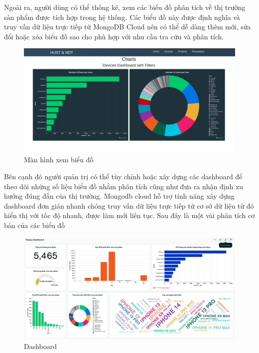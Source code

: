 \documentclass[../DoAn.tex]{subfiles}
\begin{document}
Ngoài ra, người dùng có thể thống kê, xem các biểu đồ phân tích về thị trường sản phẩm được tích hợp trong hệ thống. Các biểu đồ này được định nghĩa và truy vấn dữ liệu trực tiếp từ MongoDB Cloud nên có thể dễ dàng thêm mới, sửa đổi hoặc xóa biểu đồ sao cho phù hợp với nhu cầu tra cứu và phân tích.

\begin{figure}[H]
    \centering
    \includegraphics[scale=0.25]{Hinhve/chart_UI.png}
    \caption{Màn hình xem biểu đồ}
    \label{fig:my_label2}
\end{figure}

Bên cạnh đó người quản trị có thể tùy chỉnh hoặc xây dựng các dashboard để theo dõi những số liệu biểu đồ nhằm phân tích cũng như đưa ra nhận định xu hướng đúng đắn của thị trường. Mongodb cloud hỗ trợ tính năng xây dựng dashboard đơn giản nhanh chóng truy vấn dữ liệu trực tiếp từ cơ sở dữ liệu từ đó hiển thị với tốc độ nhanh, được làm mới liên tục.
Sau đây là một vài phân tích cơ bản của các biểu đồ 


\begin{figure}[H]
    \centering
    \includegraphics[scale=0.22]{Hinhve/dashboard.png}
    \caption{Dashboard}
    \label{fig:my_label2}
\end{figure}
\end{document}
